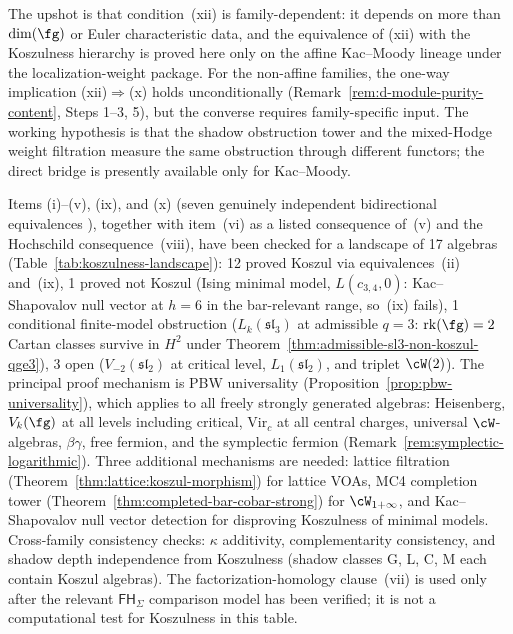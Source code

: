 \begin{remark}
The upshot is that condition~(xii) is family-dependent:
it depends on more than $\dim(\fg)$ or Euler characteristic data, and
the equivalence of (xii) with the Koszulness hierarchy is proved here
only on the affine Kac--Moody lineage under the localization-weight
package. For the non-affine families, the one-way
implication (xii)$\Rightarrow$(x) holds unconditionally
(Remark~\ref{rem:d-module-purity-content}, Steps 1--3, 5),
but the converse requires family-specific input. The working
hypothesis is that the shadow obstruction tower and the mixed-Hodge
weight filtration measure the same obstruction through different
functors; the direct bridge is presently available only for
Kac--Moody.
\end{remark}

\begin{remark}
\label{rem:koszulness-computational-landscape}
Items \textup{(i)--(v)}, \textup{(ix)}, and \textup{(x)}
\textup{(}seven genuinely independent bidirectional equivalences
\textup{)}, together with item~\textup{(vi)} as a listed
consequence of~\textup{(v)} and the Hochschild
consequence~\textup{(viii)}, have been checked for a landscape of
17 algebras
(Table~\textup{\ref{tab:koszulness-landscape}}):
12 proved Koszul via equivalences~\textup{(ii)} and~\textup{(ix)},
1 proved not Koszul (Ising minimal model,
$L(c_{3,4}, 0)$: Kac--Shapovalov null vector at $h = 6$
in the bar-relevant range, so~\textup{(ix)} fails), 1 conditional
finite-model obstruction
\textup{(}$L_k(\mathfrak{sl}_3)$ at admissible $q = 3$:
$\mathrm{rk}(\fg) = 2$ Cartan classes survive in $H^2$ under
Theorem~\textup{\ref{thm:admissible-sl3-non-koszul-qge3}}\textup{)},
3 open ($V_{-2}(\mathfrak{sl}_2)$ at critical level,
$L_1(\mathfrak{sl}_2)$, and triplet $\cW(2)$).
The principal proof mechanism is PBW universality
(Proposition~\textup{\ref{prop:pbw-universality}}), which
applies to all freely strongly generated algebras: Heisenberg,
$V_k(\fg)$ at all levels including critical, $\mathrm{Vir}_c$
at all central charges, universal $\cW$-algebras, $\beta\gamma$,
free fermion, and the symplectic fermion
(Remark~\textup{\ref{rem:symplectic-logarithmic}}).
Three additional mechanisms are needed: lattice filtration
(Theorem~\textup{\ref{thm:lattice:koszul-morphism}}) for
lattice VOAs, MC4 completion tower
(Theorem~\textup{\ref{thm:completed-bar-cobar-strong}}) for
$\cW_{1+\infty}$, and Kac--Shapovalov null vector detection
for disproving Koszulness of minimal models.
Cross-family consistency checks: $\kappa$ additivity,
complementarity consistency, and shadow depth independence
from Koszulness (shadow classes G, L, C, M each contain
Koszul algebras). The factorization-homology clause~\textup{(vii)}
is used only after the relevant $\mathsf{FH}_\Sigma$ comparison
model has been verified; it is not a computational test for
Koszulness in this table.
\end{remark}

